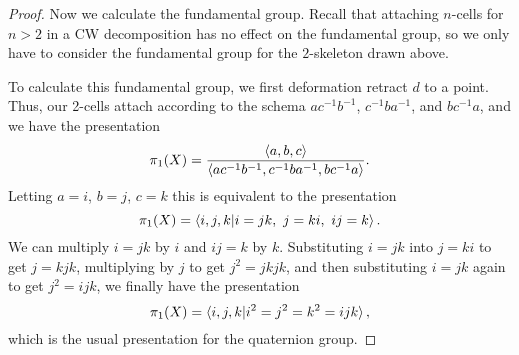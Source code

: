 \documentclass[12pt]{article}
\theoremstyle{remark}
\begin{document}
\begin{proof}
  \par Now we calculate the fundamental group. Recall that attaching $n$-cells for $n>2$ in a CW decomposition has no effect on the fundamental group, so we only have to consider the fundamental group for the $2$-skeleton drawn above.
  \par To calculate this fundamental group, we first deformation retract $d$ to a point. Thus, our 2-cells attach according to the schema $ac^{-1}b^{-1}$, $c^{-1}ba^{-1}$, and $bc^{-1}a$, and we have the presentation
  \begin{equation*}
    \pi_1(X) = \frac{\braket{a,b,c}}{\braket{ac^{-1}b^{-1}, c^{-1}ba^{-1}, bc^{-1}a}}.
  \end{equation*}
  Letting $a = i$, $b = j$, $c = k$ this is equivalent to the presentation
  \begin{equation*}
    \pi_1(X) = \braket{i,j,k | i = jk,~ j = ki,~ ij = k}.
  \end{equation*}
  We can multiply $i = jk$ by $i$ and $ij = k$ by $k$. Substituting $i = jk$ into $j = ki$ to get $j = kjk$, multiplying by $j$ to get $j^2 = jkjk$, and then substituting $i = jk$ again to get $j^2 = ijk$, we finally have the presentation
  \begin{equation*}
    \pi_1(X) = \braket{i,j,k | i^2 = j^2 = k^2 = ijk},
  \end{equation*}
  which is the usual presentation for the quaternion group.
\end{proof}

\printbibliography
\cleardoublepage
{}
\renewcommand*\contentsname{List of Solved Exercises}
{\footnotesize\tableofcontents}
\end{document}
